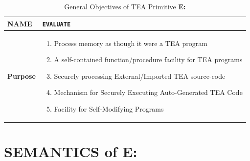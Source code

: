 \documentclass[a4paper, 18pt]{book} %
\begin{document}
\begin{table}[H]
  \centering
  \LARGE
	\begin{tabular}[t]{|p{}|p{}}
 
	\textbf{NAME} & \texttt{EVALUATE}\\
	\hline
	\textbf{Purpose} & \begin{enumerate}
	\item Process memory as though it were a TEA program
	\item A self-contained function/procedure facility for TEA programs
	\item Securely processing External/Imported TEA source-code
	\item Mechanism for Securely Executing Auto-Generated TEA Code
	\item Facility for Self-Modifying Programs
	\end{enumerate}\\
	\hline
	              
\end{tabular}
\caption{General Objectives of TEA Primitive \textbf{E:}}
  \label{TABTAZE}
\end{table}




\section{SEMANTICS of E:}
\label{SECSEME}
\end{document}
